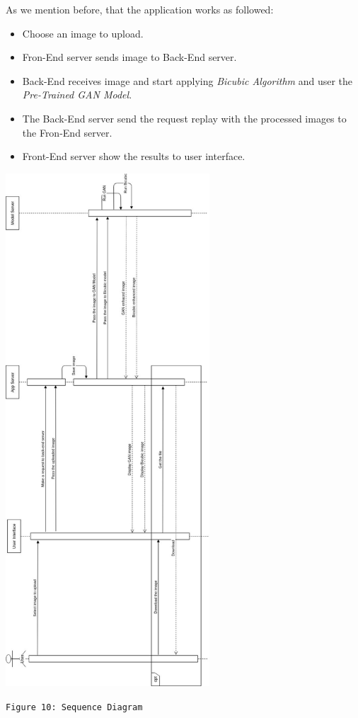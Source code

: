 \documentclass[12pt]{article}
\begin{document}
				As we mention before, that the application works as followed:
				\begin{itemize}
					\item Choose an image to upload.
					\item Fron-End server sends image to Back-End server.
					\item Back-End receives image and start applying \textit{Bicubic Algorithm} and user the \textit{Pre-Trained GAN Model}.
					\item The Back-End server send the request replay with the processed images to the Fron-End server.
					\item Front-End server show the results to user interface.
				\end{itemize}
				\begin{center}
					\vspace{0.1in}
					\includegraphics[width=3in]{Images/SequenceDiagram.jpg}
				
					\texttt{Figure 10: Sequence Diagram}
					\vspace{0.1in}
				\end{center}
\end{document}
